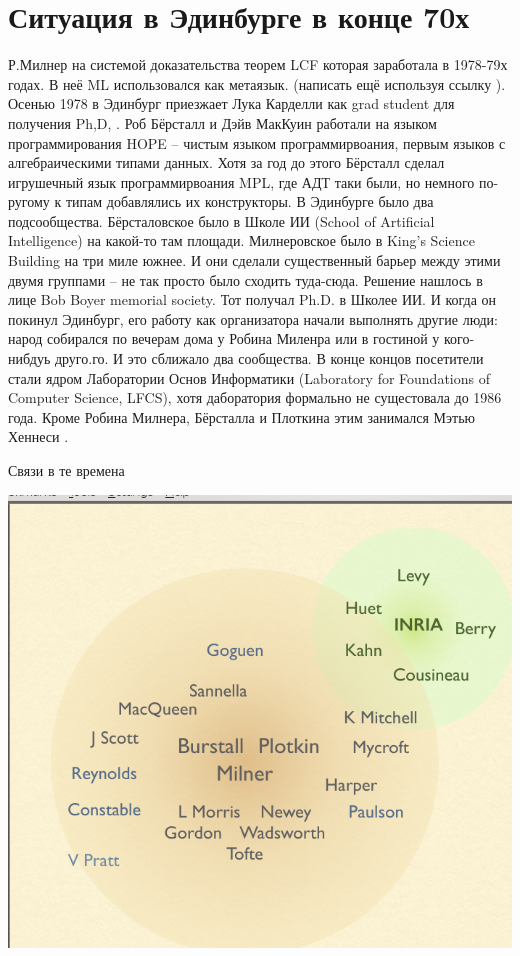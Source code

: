 \documentclass[14pt]{matmex-diploma-custom}
\begin{document}
\section{Ситуация в Эдинбурге в конце 70х}
Р.Милнер на системой доказательства теорем LCF которая заработала в 1978-79х годах. В неё ML использовался как метаязык. (написать ещё используя ссылку ). Осенью 1978 в Эдинбург приезжает Лука Карделли как grad student для получения Ph,D, . Роб Бёрсталл и Дэйв МакКуин работали на языком программирования HOPE -- чистым языком программирвоания, первым языков с алгебраическими типами данных.  Хотя за год до этого Бёрсталл сделал игрушечный язык программирвоания MPL, где АДТ таки были, но немного по-ругому к типам добавлялись их конструкторы.  
В Эдинбурге было два подсообщества. Бёрсталовское было в Школе ИИ (School of Artificial Intelligence) на какой-то там площади. Милнеровское было в King’s Science Building на три миле южнее. И они сделали существенный барьер между этими двумя группами -- не так просто было сходить туда-сюда. Решение нашлось в лице Bob Boyer memorial society. Тот получал Ph.D. в Школее ИИ. И когда он покинул Эдинбург, его работу как организатора начали выполнять другие люди: народ собирался по вечерам дома у Робина Миленра  или в гостиной у кого-нибдуь друго.го. И это сближало два   сообщества. В конце концов посетители стали ядром Лаборатории Основ Информатики (Laboratory for Foundations of Computer Science, LFCS), хотя даборатория формально не сущестовала до 1986 года.  Кроме Робина Милнера, Бёрсталла и Плоткина этим занимался Мэтью Хеннеси .

Связи в  те времена 

\includegraphics[angle=0,scale=0.585]{two_circles.png}
\end{document}
